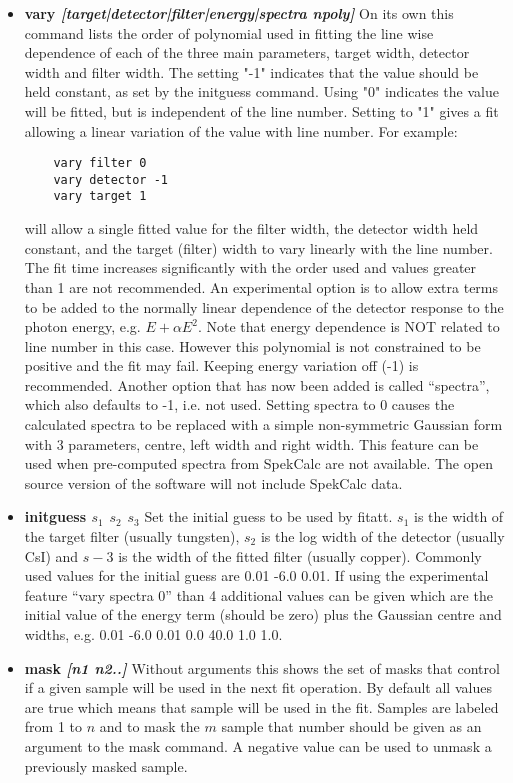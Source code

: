 \documentclass[a4paper,12pt]{article}
\begin{document}
\begin{itemize}
\item{\bf vary \it{[target|detector|filter|energy|spectra npoly]}} On its own this command lists the order of polynomial used in fitting the line wise
dependence of each of the three main parameters, target width, detector width and filter width.
The setting "-1" indicates that the value should be held constant, as set by the initguess command.
Using "0" indicates the value will be fitted, but is independent of the line number.
Setting to "1" gives a fit allowing a linear variation of the value with line number.
For example:
\begin{verbatim}
    vary filter 0
    vary detector -1
    vary target 1
\end{verbatim}
will allow a single fitted value for the filter width, the detector width held constant, and
the target (filter) width to vary linearly with the line number. 
The fit time increases significantly with the order used and values greater than 1 are not recommended.
An experimental option is to allow extra terms to be added to the normally linear dependence of the detector response to the photon energy,
e.g. $E+\alpha E^2$.
Note that energy dependence is NOT related to line number in this case.
However this polynomial is not constrained to be positive and the fit may fail.
Keeping energy variation off (-1) is recommended.
Another option that has now been added is called ``spectra'', which also defaults to -1, i.e. not used.
Setting spectra to 0 causes the calculated spectra to be replaced with a simple non-symmetric Gaussian form with 3 parameters,
centre, left width and right width.
This feature can be used when pre-computed spectra from SpekCalc are not available.
The open source version of the software will not include SpekCalc data.

\item{\bf initguess \it{$s_1$ $s_2$ $s_3$}} Set the initial guess to be used by fitatt.
$s_1$ is the width of the target filter (usually tungsten), $s_2$ is the log width of the detector (usually CsI) and $s-3$ is the width of the
fitted filter (usually copper). Commonly used values for the initial guess are 0.01 -6.0 0.01.
If using the experimental feature ``vary spectra 0'' than 4 additional values can be given which are the initial value of the
energy term (should be zero) plus the Gaussian centre and widths, e.g. 0.01 -6.0 0.01 0.0 40.0 1.0 1.0.

\item{\bf mask \it{[n1 n2..]}} Without arguments this shows the set of masks that control if a given sample will be used in the next fit operation.
By default all values are true which means that sample will be used in the fit. Samples are labeled from 1 to $n$ and to mask the $m$ sample
that number should be given as an argument to the mask command. A negative value can be used to unmask a previously masked sample.


\end{itemize}
\end{document}
